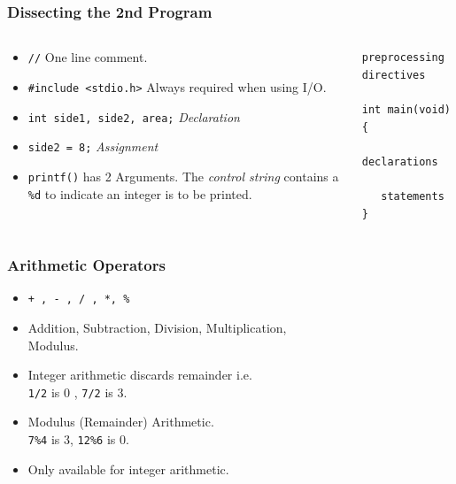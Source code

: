 \begin{frame}[fragile]
\frametitle{Dissecting the 2nd Program}

\begin{columns}
\begin{column}{0.5\textwidth}
\begin{itemize}[<+->]
\item \verb^//^ One line comment.
\item \verb^#include <stdio.h>^ Always required when using I/O.
\item \verb^int side1, side2, area;^ {\it Declaration}
\item \verb^side2 = 8;^ {\it  Assignment }
\item \verb^printf()^ has 2 Arguments.
The {\it control string}
contains a \verb+%d+ to indicate an integer is to be printed.
\end{itemize}
\end{column}

\begin{column}{0.5\textwidth}
\begin{lstlisting}[style=basicc]
preprocessing directives

int main(void)
{
   declarations

   statements
}
\end{lstlisting}
\end{column}

\end{columns}
\end{frame}




\begin{frame}[fragile]
\frametitle{Arithmetic Operators}

\begin{itemize}[<+->]
\item \verb^+ , - , / , *, %^
\item Addition, Subtraction, Division, Multiplication,\\ Modulus.
\item Integer arithmetic discards remainder i.e.\\
\verb+1/2+ is 0 , \verb+7/2+ is 3.
\item Modulus (Remainder) Arithmetic.\\
\verb+7%4+ is 3, \verb+12%6+ is 0.

\item
Only available for integer arithmetic.
\end{itemize}
\end{frame}



